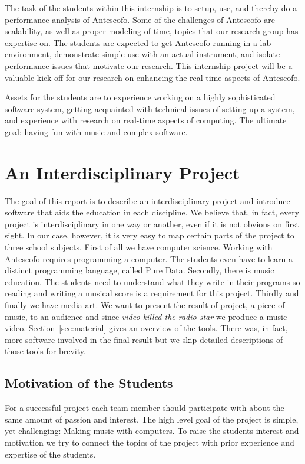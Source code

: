 \documentclass[onecolumn,nocopyrightspace,preprint]{sigplanconf}
\begin{document}
The task of the students within this internship is to setup, use, and thereby
do a performance analysis of Antescofo. Some of the challenges of Antescofo
are scalability, as well as proper modeling of time, topics that our research
group has expertise on. The students are expected to get Antescofo running in
a lab environment, demonstrate simple use with an actual instrument, and
isolate performance issues that motivate our research. This internship
project will be a valuable kick-off for our research on enhancing the 
real-time aspects of Antescofo.

Assets for the students are to experience working on a highly sophisticated
software system, getting acquainted with technical issues of setting up a
system, and experience with research on real-time aspects of computing. The
ultimate goal: having fun with music and complex software.


\section{An Interdisciplinary Project}

The goal of this report is to describe an interdisciplinary project and
introduce software that aids the education in each discipline.  We believe
that, in fact, every project is interdisciplinary in one way or another, even
if it is not obvious on first sight. In our case, however, it is very easy to
map certain parts of the project to three school subjects. First of all we
have computer science. Working with Antescofo requires programming a computer.
The students even have to learn a distinct programming language, called Pure
Data. Secondly, there is music education. The students need to understand what
they write in their programs so reading and writing a musical score is a
requirement for this project. Thirdly and finally we have media art. We want
to present the result of project, a piece of music, to an audience and since
\textit{video killed the radio star} we produce a music video.
Section~\ref{sec:material} gives an overview of the tools. There was, in fact,
more software involved in the final result but we skip detailed descriptions
of those tools for brevity.


\subsection{Motivation of the Students}

For a successful project each team member should participate with about the
same amount of passion and interest.  The high level goal of the project is
simple, yet challenging: Making music with computers. To raise the students
interest and motivation we try to connect the topics of the project with prior
experience and expertise of the students.
\end{document}
